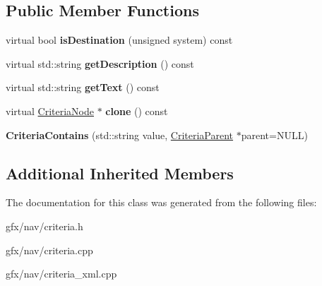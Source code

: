 \subsection*{Public Member Functions}
\begin{DoxyCompactItemize}
\item 
virtual bool {\bfseries is\+Destination} (unsigned system) const \hypertarget{classCriteriaContains_a61f37208b2ba2d6a18a72f6d8c2ed550}{}\label{classCriteriaContains_a61f37208b2ba2d6a18a72f6d8c2ed550}

\item 
virtual std\+::string {\bfseries get\+Description} () const \hypertarget{classCriteriaContains_a2e198ffe3607077241861ee44ac0cb78}{}\label{classCriteriaContains_a2e198ffe3607077241861ee44ac0cb78}

\item 
virtual std\+::string {\bfseries get\+Text} () const \hypertarget{classCriteriaContains_a4150023cc0623925bac7815f628c478e}{}\label{classCriteriaContains_a4150023cc0623925bac7815f628c478e}

\item 
virtual \hyperlink{classCriteriaNode}{Criteria\+Node} $\ast$ {\bfseries clone} () const \hypertarget{classCriteriaContains_a379671ff14879b79819ad51452cf8d0b}{}\label{classCriteriaContains_a379671ff14879b79819ad51452cf8d0b}

\item 
{\bfseries Criteria\+Contains} (std\+::string value, \hyperlink{classCriteriaParent}{Criteria\+Parent} $\ast$parent=N\+U\+LL)\hypertarget{classCriteriaContains_a5c8c02ed3472dbc938a9c000002f1d4c}{}\label{classCriteriaContains_a5c8c02ed3472dbc938a9c000002f1d4c}

\end{DoxyCompactItemize}
\subsection*{Additional Inherited Members}


The documentation for this class was generated from the following files\+:\begin{DoxyCompactItemize}
\item 
gfx/nav/criteria.\+h\item 
gfx/nav/criteria.\+cpp\item 
gfx/nav/criteria\+\_\+xml.\+cpp\end{DoxyCompactItemize}
